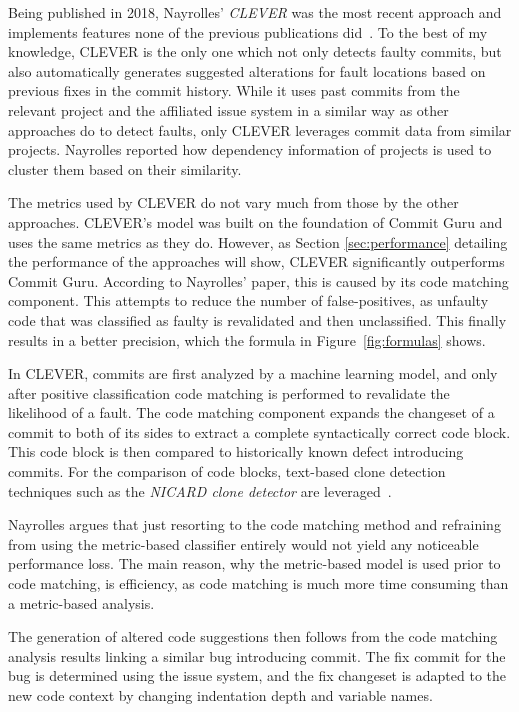 Being published in 2018, Nayrolles' \textit{CLEVER} was the most recent approach and implements features none of the previous publications did~\cite{Nayrolles2018}. To the best of my knowledge, CLEVER is the only one which not only detects faulty commits, but also automatically generates suggested alterations for fault locations based on previous fixes in the commit history. While it uses past commits from the relevant project and the affiliated issue system in a similar way as other approaches do to detect faults, only CLEVER leverages commit data from similar projects. Nayrolles reported how dependency information of projects is used to cluster them based on their similarity.

The metrics used by CLEVER do not vary much from those by the other approaches. CLEVER's model was built on the foundation of Commit Guru and uses the same metrics as they do. However, as Section \ref{sec:performance} detailing the performance of the approaches will show, CLEVER significantly outperforms Commit Guru. According to Nayrolles' paper, this is caused by its code matching component.
This attempts to reduce the number of false-positives, as unfaulty code that was classified as faulty is revalidated and then unclassified. This finally results in a better precision, which the formula in Figure~\ref{fig:formulas} shows.

In CLEVER, commits are first analyzed by a machine learning model, and only after positive classification code matching is performed to revalidate the likelihood of a fault. The code matching component expands the changeset of a commit to both of its sides to extract a complete syntactically correct code block. This code block is then compared to historically known defect introducing commits. For the comparison of code blocks, text-based clone detection techniques such as the \textit{NICARD clone detector} are leveraged~\cite{Nayrolles2018}.

Nayrolles argues that just resorting to the code matching method and refraining from using the metric-based classifier entirely would not yield any noticeable performance loss. The main reason, why the metric-based model is used prior to code matching, is efficiency, as code matching is much more time consuming than a metric-based analysis.

The generation of altered code suggestions then follows from the code matching analysis results linking a similar bug introducing commit.
The fix commit for the bug is determined using the issue system, and the fix changeset is adapted to the new code context by changing indentation depth and variable names.


